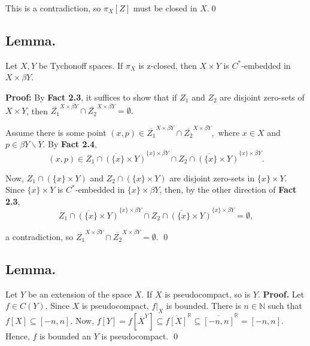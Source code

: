 \documentclass{article}
\begin{document}
\vskip 15pt

This is a contradiction, so $\pi_X[Z]$ must be closed in $X$.\qed




\vskip 40pt







\subsection{Lemma.}  Let $X,Y$ be Tychonoff spaces. If $\pi_X$ is z-closed, then $X\times Y$ is $C^*$-embedded in $X\times \beta Y$.


\vskip 15pt


\textbf{Proof:} By \textbf{Fact 2.3}, it suffices to show that if $Z_1$ and $Z_2$ are disjoint zero-sets of $X\times Y$, then $\overline{Z_1}^{X\times \beta Y} \cap \overline{Z_2}^{X\times \beta Y}=\emptyset.$

\vskip 15pt

 Assume there is some point $(x,p)\in \overline{Z_1}^{X\times \beta Y}\cap \overline{Z_2}^{X\times \beta Y},$ where $x\in X$ and $p\in \beta Y\backslash Y$. By \textbf{Fact 2.4}, $$(x,p)\in \overline{Z_1\cap (\{x\}\times Y)}^{\{x\}\times \beta Y} \cap \overline{Z_2\cap (\{x\}\times Y)}^{\{x\}\times \beta Y}.$$

\vskip 10pt

Now, $Z_1\cap (\{x\}\times Y)$ and $Z_2\cap (\{x\} \times Y)$ are disjoint zero-sets in $\{x\}\times Y$. Since $\{x\}\times Y$ is $C^*$-embedded in $\{x\}\times \beta Y$, then, by the other direction of \textbf{Fact 2.3}, $$\overline{Z_1\cap (\{x\}\times Y)}^{\{x\}\times \beta Y} \cap \overline{Z_2\cap (\{x\}\times Y)}^{\{x\}\times \beta Y}=\emptyset,$$

a contradiction, so $\overline{Z_1}^{X\times \beta Y} \cap \overline{Z_2}^{X\times \beta Y} =\emptyset$.  \qed





\vskip 40pt


\subsection{Lemma.} Let $Y$ be an extension of the space $X$. If $X$ is pseudocompact, so is $Y$. 
\vskip 20pt
\textbf{Proof.} Let $f\in C(Y)$. Since $X$ is pseudocompact, $f|_X$ is bounded. There is $n\in \mathbb{N}$ such that $f[X]\subseteq [-n,n].$ Now, $f[Y]=f\left[\overline{X}^Y\right]\subseteq \overline{f[X]}^\mathbb{R} \subseteq \overline{[-n,n]}^\mathbb{R}=[-n,n].$ Hence, $f$ is bounded an $Y$ is pseudocompact. \qed
\end{document}
